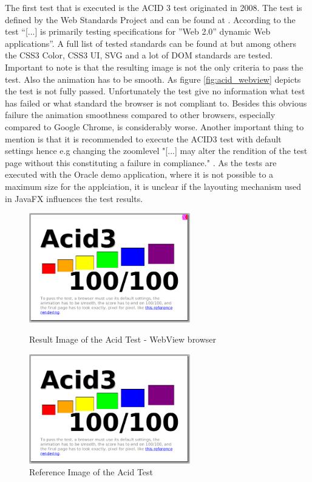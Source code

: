 The first test that is executed is the ACID 3 test originated in 2008.
The test is defined by the Web Standards Project and can be found at \autocite{tech-ana:acid3}.
According to \autocite{tech-ana:acid3} the test \enquote{[...] is primarily testing specifications for ''Web 2.0'' dynamic Web applications}. 
A full list of tested standards can be found at \autocite{tech-ana:acid3} but among others the CSS3 Color, CSS3 UI, SVG and a lot of DOM standards are tested.
Important to note is that the resulting image is not the only criteria to pass the test.
Also the animation has to be smooth.
As figure \ref{fig:acid_webview} depicts the test is not fully passed.
Unfortunately the test give no information what test has failed or what standard the browser is not compliant to.
Besides this obvious failure the animation smoothness compared to other browsers, especially compared to Google Chrome, is considerably worse.
Another important thing to mention is that it is recommended to execute the ACID3 test with default settings hence e.g changing the zoomlevel "[...] may alter the rendition of the test page without this constituting a failure in compliance." \autocite{tech-ana:acid3}.
As the tests are executed with the Oracle demo application, where it is not possible to a maximum size for the applciation, it is unclear if the layouting mechanism used in JavaFX influences the test results.

\begin{figure}
\begin{minipage}[t]{7cm}
	\centering
	\includegraphics[width=7cm]{./img/tech-ana/acid_result_webView.png}
	\caption{Result Image of the Acid Test - WebView browser}
	\label{fig:acid_webview}
\end{minipage}
\hfill
\begin{minipage}[t]{7cm}
	\centering
	\includegraphics[width=7cm]{./img/tech-ana/acid_reference.png}
	\caption{Reference Image of the Acid Test}
	\label{fig:acid_reference}
\end{minipage}
\end{figure}

